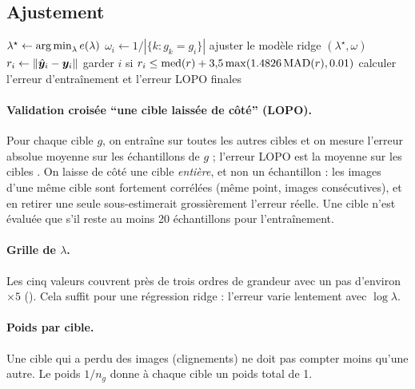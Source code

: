 \subsection{Ajustement}

\begin{algorithm}[H]
\caption{Ajustement de la calibration v1 ()}
$\lambda^\star \leftarrow \operatorname*{arg\,min}_\lambda e(\lambda)$\;
$\omega_i \leftarrow 1/|\{k : g_k = g_i\}|$ 
ajuster le modèle ridge $(\lambda^\star, \omega)$\;
$r_i \leftarrow \|\hat{\bm{y}}_i - \bm{y}_i\|$\;
garder $i$ si $r_i \leq \operatorname{med}(r) + 3{,}5 \max(\num{1.4826}\operatorname{MAD}(r), \num{0.01})$\;
calculer l'erreur d'entraînement et l'erreur LOPO finales\;
\end{algorithm}

\paragraph{Validation croisée \enquote{une cible laissée de côté} (LOPO).} Pour chaque cible $g$, on entraîne sur toutes les autres cibles et on mesure l'erreur absolue moyenne sur les échantillons de $g$ ; l'erreur LOPO est la moyenne sur les cibles \cite{stone1974}. On laisse de côté une cible \emph{entière}, et non un échantillon : les images d'une même cible sont fortement corrélées (même point, images consécutives), et en retirer une seule sous-estimerait grossièrement l'erreur réelle. Une cible n'est évaluée que s'il reste au moins 20 échantillons pour l'entraînement.

\paragraph{Grille de $\lambda$.} Les cinq valeurs couvrent près de trois ordres de grandeur avec un pas d'environ $\times5$ (\empi). Cela suffit pour une régression ridge : l'erreur varie lentement avec $\log\lambda$.

\paragraph{Poids par cible.} Une cible qui a perdu des images (clignements) ne doit pas compter moins qu'une autre. Le poids $1/n_g$ donne à chaque cible un poids total de 1.

